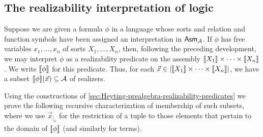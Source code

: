 \subsection{The realizability interpretation of logic}\label{sec:realizability-interpretation}

Suppose we are given a formula \(\phi\) in a language whose sorts and relation
and function symbols have been assigned an interpretation in \(\Asm{\AA}\).
%
If \(\phi\) has free variables \(x_1,\dots,x_n\) of sorts \(X_1,\dots,X_n\),
then, following the preceding development, we may interpret \(\phi\) as a
realizability predicate on the assembly \(\sem{X_1} \times \cdots\times \sem{X_n}\).
%
We write \(\sem{\phi}\) for this predicate. Thus, for each
\(\vec x \in \carrier*{\sem{X_1}\times\cdots\times\sem{X_n}}\), we have a subset
\(\sem{\phi}(\vec x) \subseteq \AA\) of realizers.

Using the constructions of
\cref{sec:Heyting-prealgebra-realizability-predicates} we prove the following
recursive characterization of membership of such subsets, where we use
\(\vec x_{|_\phi}\) for the restriction of a tuple to those elements that
pertain to the domain of \(\sem{\phi}\) (and similarly for terms).

